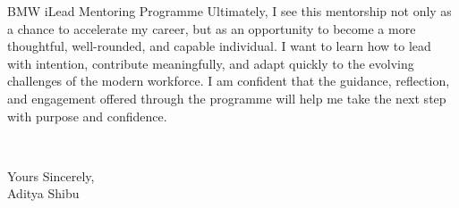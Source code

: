 \documentclass{letter}
\begin{document}
\begin{letter}{BMW iLead Mentoring Programme}
Ultimately, I see this mentorship not only as a chance to accelerate my career, but as an opportunity to become a more thoughtful, well-rounded, and capable individual. I want to learn how to lead with intention, contribute meaningfully, and adapt quickly to the evolving challenges of the modern workforce. I am confident that the guidance, reflection, and engagement offered through the programme will help me take the next step with purpose and confidence.

\closing{~}

Yours Sincerely,\\[2mm]
Aditya Shibu

\end{letter}
\end{document}
